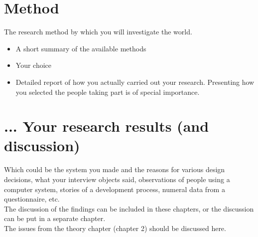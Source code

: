   \section{Method}
    The research method by which you will investigate the world.
    \begin{itemize} 
      \item A short summary of the available methods
      \item Your choice
      \item Detailed report of how you actually carried out your research. Presenting how you selected 
        the people taking part is of special importance.
    \end{itemize}
  
  \section{... Your research results (and discussion)}
    Which could be the system you made and the reasons for various design decisions, what your 
      interview objects said, observations of people using a computer system, stories of a development 
      process, numeral data from a questionnaire, etc. \\
    The discussion of the findings can be included in these chapters, or the discussion can be put in 
      a separate chapter.  \\
    The issues from the theory chapter (chapter 2) should be discussed here.


